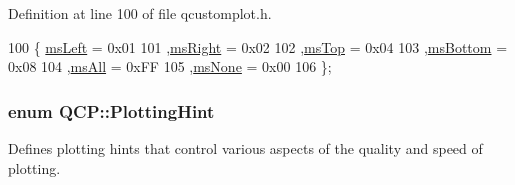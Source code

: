 Definition at line 100 of file qcustomplot.\+h.


\begin{DoxyCode}
100                 \{ \hyperlink{namespace_q_c_p_a7e487e3e2ccb62ab7771065bab7cae54a9500c8bfcc9e80b9dff0a8e00e867f07}{msLeft}     = 0x01 
101                   ,\hyperlink{namespace_q_c_p_a7e487e3e2ccb62ab7771065bab7cae54a93c719593bb2b94ed244d52c86d83b65}{msRight}   = 0x02 
102                   ,\hyperlink{namespace_q_c_p_a7e487e3e2ccb62ab7771065bab7cae54a5db8fb0d0b0ecf0d611c2602a348e8a0}{msTop}     = 0x04 
103                   ,\hyperlink{namespace_q_c_p_a7e487e3e2ccb62ab7771065bab7cae54a5241d8eac2bab9524a38889f576179cc}{msBottom}  = 0x08 
104                   ,\hyperlink{namespace_q_c_p_a7e487e3e2ccb62ab7771065bab7cae54a43d7361cb0c5244eabdc962021bffebc}{msAll}     = 0xFF 
105                   ,\hyperlink{namespace_q_c_p_a7e487e3e2ccb62ab7771065bab7cae54a80aa4149f16dabd538f8b2e3d42c42d5}{msNone}    = 0x00 
106                 \};
\end{DoxyCode}
\hypertarget{namespace_q_c_p_a5400e5fcb9528d92002ddb938c1f4ef4}{}
\subsubsection[{Plotting\+Hint}]{\setlength{\rightskip}{0pt plus 5cm}enum {\bf Q\+C\+P\+::\+Plotting\+Hint}}\label{namespace_q_c_p_a5400e5fcb9528d92002ddb938c1f4ef4}
Defines plotting hints that control various aspects of the quality and speed of plotting.

